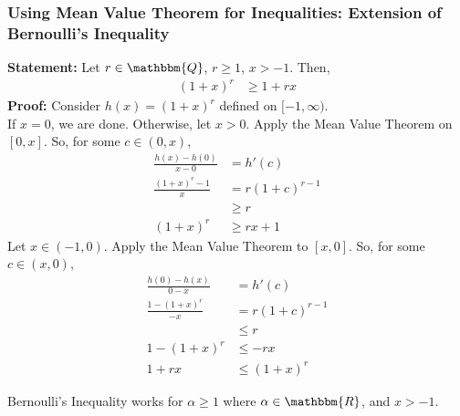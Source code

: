 \documentclass[10pt]{extarticle}
\newcommand{\Q}{\mathbbm{Q}}
\newcommand{\R}{\mathbbm{R}}
\begin{document}
  \subsubsection{Using Mean Value Theorem for Inequalities: Extension of Bernoulli's Inequality}%
  \textbf{Statement:} Let $r \in \Q$, $r \geq 1$, $x > -1$. Then,
  \begin{align*}
    (1+x)^{r} &\geq 1 + rx
  \end{align*}
  \textbf{Proof:} Consider $h(x) = (1+x)^{r}$ defined on $[-1,\infty)$.\\
  If $x = 0$, we are done. Otherwise, let $x > 0$. Apply the Mean Value Theorem on $[0,x]$. So, for some $c\in (0,x)$,
  \begin{align*}
    \frac{h(x)-h(0)}{x-0} &= h'(c)\\
    \frac{(1+x)^r-1}{x} &= r(1+c)^{r-1}\\
                        &\geq r\\
    (1+x)^{r} &\geq rx +1
  \end{align*}
  Let $x\in (-1,0)$. Apply the Mean Value Theorem to $[x,0]$. So, for some $c\in (x,0)$,
  \begin{align*}
    \frac{h(0)-h(x)}{0-x} &= h'(c)\\
    \frac{1-(1+x)^r}{-x} &= r(1+c)^{r-1}\\
                         &\leq r\\
    1-(1+x)^r &\leq -rx\\
    1+rx &\leq (1+x)^{r}
  \end{align*}
  \begin{description}
    \small
    \item[Remark:] Bernoulli's Inequality works for $\alpha \geq 1$ where $\alpha\in\R$, and $x > -1$.
  \end{description}
\end{document}
